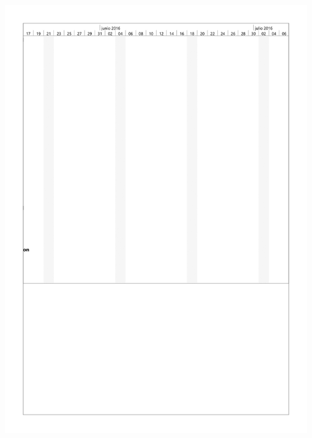 \documentclass{DeustoFDP}
\begin{document}
\begin{center}
	\includegraphics[width=1\linewidth]{fig/g5}
\end{center}
\newpage
\end{document}
